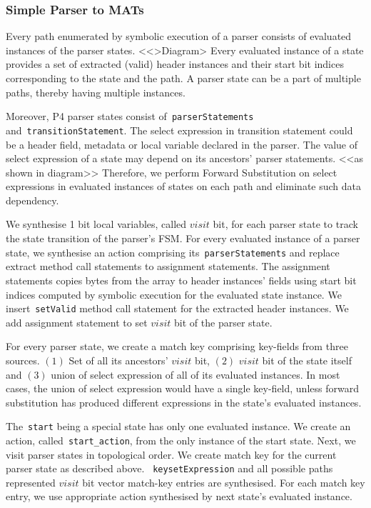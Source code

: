 \subsubsection{Simple Parser to MATs}
\label{subsubsection:simple-parser-to-mats}
Every path enumerated by symbolic execution of a parser consists of evaluated instances of the parser states.
<<>Diagram>
Every evaluated instance of a state provides a set of extracted (valid) header instances and their start bit indices corresponding to the state and the path.
A parser state can be a part of multiple paths, thereby having multiple instances.

Moreover, P4 parser states consist of~\texttt{parser\-Statements} and~\texttt{transition\-Statement}.
The select expression in transition statement could be a header field, metadata or local variable declared in the parser.
The value of select expression of a state may depend on its ancestors' parser statements. <<as shown in diagram>>
Therefore, we perform Forward Substitution on select expressions in evaluated instances of states
on each path and eliminate such data dependency.

We synthesise 1 bit local variables, called $visit$ bit, for each parser state to track the state transition of the parser's FSM.
For every evaluated instance of a parser state, we synthesise an action comprising its~\texttt{parser\-Statements} and replace extract method call statements to assignment statements.
The assignment statements copies bytes from the array to header instances' fields using start bit indices computed by symbolic execution for the evaluated state instance.
We insert~\texttt{setValid} method call statement for the extracted header instances.
We add assignment statement to set $visit$ bit of the parser state.

For every parser state, we create a match key comprising key-fields from three sources. 
$(1)$ Set of all its ancestors' $visit$ bit,
$(2)$ $visit$ bit of the state itself and
$(3)$ union of select expression of all of its evaluated instances.
In most cases, the union of select expression would have a single key-field, unless forward substitution has produced different expressions in the state's evaluated instances.

The~\texttt{start} being a special state has only one evaluated instance.
We create an action, called~\texttt{start\_action}, from the only instance of the start state.
Next, we visit parser states in topological order. 
We create match key for the current parser state as described above.
~\texttt{keysetExpression} and all possible paths represented $visit$ bit vector match-key entries are synthesised.
For each match key entry, we use appropriate action synthesised by next state's evaluated instance.

